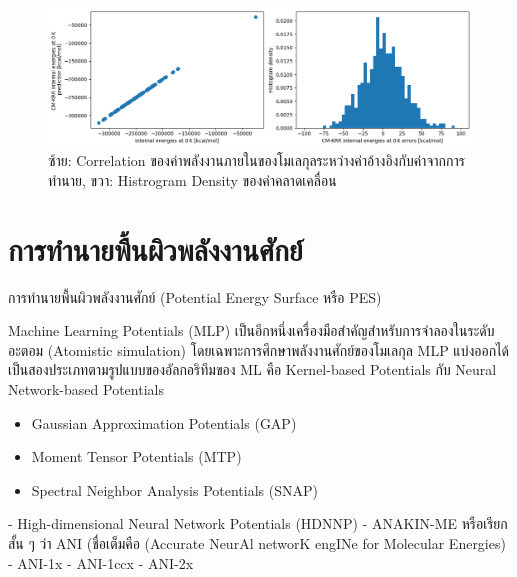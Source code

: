 \begin{figure}[H]
    \centering
    \includegraphics[width=\linewidth]{fig/qm9_cm_kernel_corr.png}
    \caption{ซ้าย: Correlation ของค่าพลังงานภายในของโมเลกุลระหว่างค่าอ้างอิงกับค่าจากการทำนาย, ขวา: Histrogram Density 
    ของค่าคลาดเคลื่อน}
    \label{fig:qm9_cm_kernel_corr}
\end{figure}

\section{การทำนายพื้นผิวพลังงานศักย์}
\label{sec:pred_pot_ener}

การทำนายพื้นผิวพลังงานศักย์ (Potential Energy Surface หรือ PES)

Machine Learning Potentials (MLP) เป็นอีกหนึ่งเครื่องมือสำคัญสำหรับการจำลองในระดับอะตอม (Atomistic simulation) 
โดยเฉพาะการศึกษาพลังงานศักย์ของโมเลกุล\autocite{behler2016,botu2017,brockherde2017,deringer2019,noe2020} 
MLP แบ่งออกได้เป็นสองประเภทตามรูปแบบของอัลกอริทึมของ ML คือ Kernel-based Potentials กับ Neural Network-based Potentials

\begin{itemize}
    \item Gaussian Approximation Potentials (GAP)\autocite{bartok2010}
    
    \item Moment Tensor Potentials (MTP)\autocite{shapeev2016}
    
    \item Spectral Neighbor Analysis Potentials (SNAP)\autocite{thompson2015}
\end{itemize}


- High-dimensional Neural Network Potentials (HDNNP)\autocite{behler2007}
- ANAKIN-ME หรือเรียกสั้น ๆ ว่า ANI (ชื่อเต็มคือ (Accurate NeurAl networK engINe for Molecular Energies)
    - ANI-1x\autocite{smith2017}
    - ANI-1ccx\autocite{smith2018}
    - ANI-2x\autocite{smith2019}

